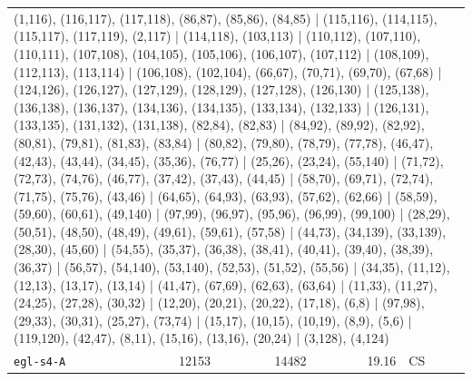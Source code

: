 \begin{longtable}{lrrrl}
\multicolumn{5}{p{0.96\linewidth}}{\tiny\raggedright\arraybackslash (1,116), (116,117), (117,118), (86,87), (85,86), (84,85) | (115,116), (114,115), (115,117), (117,119), (2,117) | (114,118), (103,113) | (110,112), (107,110), (110,111), (107,108), (104,105), (105,106), (106,107), (107,112) | (108,109), (112,113), (113,114) | (106,108), (102,104), (66,67), (70,71), (69,70), (67,68) | (124,126), (126,127), (127,129), (128,129), (127,128), (126,130) | (125,138), (136,138), (136,137), (134,136), (134,135), (133,134), (132,133) | (126,131), (133,135), (131,132), (131,138), (82,84), (82,83) | (84,92), (89,92), (82,92), (80,81), (79,81), (81,83), (83,84) | (80,82), (79,80), (78,79), (77,78), (46,47), (42,43), (43,44), (34,45), (35,36), (76,77) | (25,26), (23,24), (55,140) | (71,72), (72,73), (74,76), (46,77), (37,42), (37,43), (44,45) | (58,70), (69,71), (72,74), (71,75), (75,76), (43,46) | (64,65), (64,93), (63,93), (57,62), (62,66) | (58,59), (59,60), (60,61), (49,140) | (97,99), (96,97), (95,96), (96,99), (99,100) | (28,29), (50,51), (48,50), (48,49), (49,61), (59,61), (57,58) | (44,73), (34,139), (33,139), (28,30), (45,60) | (54,55), (35,37), (36,38), (38,41), (40,41), (39,40), (38,39), (36,37) | (56,57), (54,140), (53,140), (52,53), (51,52), (55,56) | (34,35), (11,12), (12,13), (13,17), (13,14) | (41,47), (67,69), (62,63), (63,64) | (11,33), (11,27), (24,25), (27,28), (30,32) | (12,20), (20,21), (20,22), (17,18), (6,8) | (97,98), (29,33), (30,31), (25,27), (73,74) | (15,17), (10,15), (10,19), (8,9), (5,6) | (119,120), (42,47), (8,11), (15,16), (13,16), (20,24) | (3,128), (4,124)} \\[2pt]
\texttt{egl-s4-A} & 12153 & 14482 & 19.16 & CS \\

\end{longtable}
